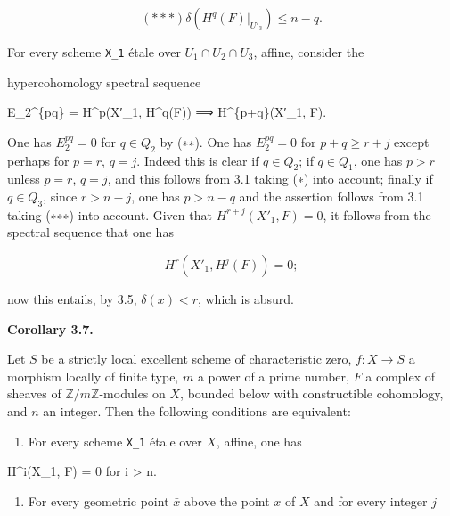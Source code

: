 \documentclass[
]{article}
\newenvironment{Shaded}{}{}
\newcommand{\NormalTok}[1]{#1}
\providecommand{\tightlist}{%
  \setlength{\itemsep}{0pt}\setlength{\parskip}{0pt}}
\begin{document}
\[
(\ast\ast\ast)  \delta(H^{q}(F)|_{U'_{3}}) \leqslant n - q.
\]

For every scheme \texttt{X\_1} étale over
\(U_{1} \cap U_{2} \cap U_{3}\), affine, consider the

hypercohomology spectral sequence

\begin{Shaded}
\begin{Highlighting}[]
\NormalTok{E\_2\^{}\{pq\} = H\^{}p(X′\_1, H\^{}q(F)) ⟹ H\^{}\{p+q\}(X′\_1, F).}
\end{Highlighting}
\end{Shaded}

One has \(E^{pq}_{2} = 0\) for \(q \in Q_{2}\) by (∗∗). One has
\(E^{pq}_{2} = 0\) for \(p + q \geqslant r + j\) except perhaps for
\(p = r\), \(q = j\). Indeed this is clear if \(q \in Q_{2}\); if
\(q \in Q_{1}\), one has \(p > r\) unless \(p = r\), \(q = j\), and this
follows from 3.1 taking (∗) into account; finally if \(q \in Q_{3}\),
since \(r > n - j\), one has \(p > n - q\) and the assertion follows
from 3.1 taking (∗∗∗) into account. Given that
\(H^{r+j}(X'_{1}, F) = 0\), it follows from the spectral sequence that
one has

\[
H^{r}(X'_{1}, H^{j}(F)) = 0;
\]

now this entails, by 3.5, \(\delta(x) < r\), which is absurd.

\textbf{Corollary 3.7.}

Let \(S\) be a strictly local excellent scheme of characteristic zero,
\(f : X \to S\) a morphism locally of finite type, \(m\) a power of a
prime number, \(F\) a complex of sheaves of
\(\mathbb{Z}/m\mathbb{Z}\)-modules on \(X\), bounded below with
constructible cohomology, and \(n\) an integer. Then the following
conditions are equivalent:

\begin{enumerate}
\def\labelenumi{(\roman{enumi})}
\tightlist
\item
  For every scheme \texttt{X\_1} étale over \(X\), affine, one has
\end{enumerate}

\begin{Shaded}
\begin{Highlighting}[]
\NormalTok{H\^{}i(X\_1, F) = 0 for i \textgreater{} n.}
\end{Highlighting}
\end{Shaded}

\begin{enumerate}
\def\labelenumi{(\roman{enumi})}
\setcounter{enumi}{1}
\tightlist
\item
  For every geometric point \(\bar{x}\) above the point \(x\) of \(X\)
  and for every integer \(j\)
\end{enumerate}
\end{document}

